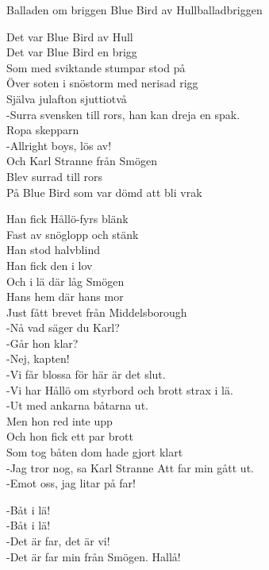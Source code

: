 \begin{song}{Balladen om briggen Blue Bird av Hull}{balladbriggen}
\begin{vers}
Det var Blue Bird av Hull\\
Det var Blue Bird en brigg\\
Som med sviktande stumpar stod på\\
Över soten i snöstorm med nerisad rigg\\
Själva julafton sjuttiotvå\\
-Surra svensken till rors, han kan dreja en spak.\\
Ropa skepparn\\
-Allright boys, lös av!\\
Och Karl Stranne från Smögen\\
Blev surrad till rors\\
På Blue Bird som var dömd att bli vrak\\
\end{vers}
\begin{vers}
Han fick Hållö-fyrs blänk\\
Fast av snöglopp och stänk\\
Han stod halvblind\\
Han fick den i lov\\
Och i lä där låg Smögen\\
Hans hem där hans mor\\
Just fått brevet från Middelsborough\\
-Nå vad säger du Karl?\\
-Går hon klar?\\
-Nej, kapten!\\
-Vi får blossa för här är det slut.\\
-Vi har Hållö om styrbord och brott strax i lä.\\
-Ut med ankarna båtarna ut.\\
Men hon red inte upp\\
Och hon fick ett par brott\\
Som tog båten dom hade gjort klart\\
-Jag tror nog, sa Karl Stranne Att far min gått ut.\\
-Emot oss, jag litar på far!\\
\end{vers}
\begin{vers}
-Båt i lä!\\
-Båt i lä!\\
-Det är far, det är vi!\\
-Det är far min från Smögen. Hallå!\\

\end{vers}
\end{song}
